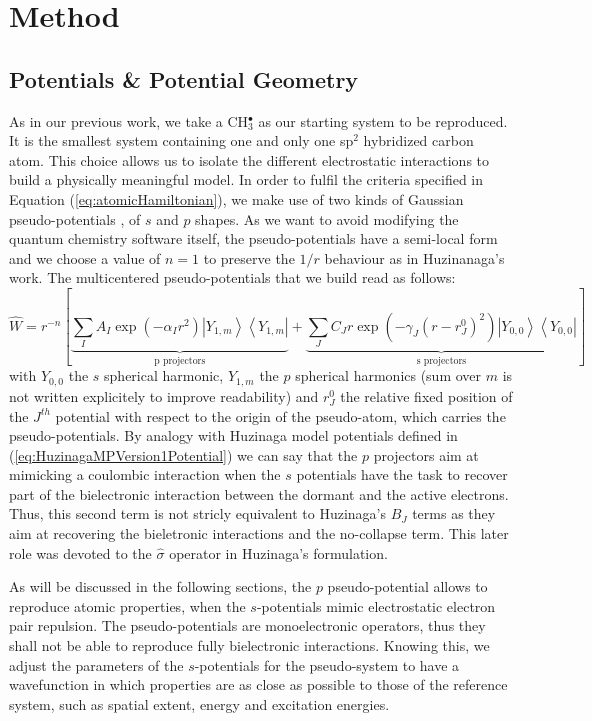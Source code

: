 \documentclass[journal=jctcce,manuscript=article]{achemso}
\begin{document}
\section{Method}

\subsection{Potentials \& Potential Geometry}

As in our previous work\cite{drujon_pseudopotentials_2013},
we take a CH\(^{\bullet}_{3}\) as our starting system to be reproduced.
It is the smallest system containing one and only one sp$^2$ hybridized carbon atom.
This choice allows us to isolate the different electrostatic interactions
to build a physically meaningful model.
In order to fulfil the criteria specified in Equation (\ref{eq:atomicHamiltonian}),
we make use of two kinds of Gaussian pseudo-potentials \cite{me_structure_theory}, of \(s\) and \(p\) shapes. As we want to avoid modifying the quantum chemistry software itself, the pseudo-potentials have a semi-local form and we choose a value of \(n = 1\) to preserve the \(1/r\) behaviour as in Huzinanaga's work.
The multicentered pseudo-potentials that we build read as follows:
\begin{equation}
\label{eq:ourPP}
\hat{W} = r^{-n}\left[%
\underbrace{\sum_IA_I\exp(-\alpha_I r^2)\left|Y_{1,m}\right>\left<Y_{1,m}\right|}_{\text{p projectors}}%
+%
\underbrace{\sum_JC_Jr\exp(-\gamma_J (r-r^0_J)^2)\left|Y_{0,0}\right>\left<Y_{0,0}\right|}_{\text{s projectors}}%
\right]
\end{equation}
with $Y_{0,0}$ the $s$ spherical harmonic, $Y_{1,m}$ the $p$ spherical harmonics (sum over $m$
is not written explicitely to improve readability) and $r^0_J$ the relative fixed position of the $J^{th}$
potential with respect to the origin of the pseudo-atom, which carries the pseudo-potentials.
By analogy with Huzinaga model potentials defined in (\ref{eq:HuzinagaMPVersion1Potential})
we can say that the $p$ projectors aim at mimicking a coulombic interaction
when the $s$ potentials have the task to recover part of the bielectronic interaction
between the dormant and the active electrons.
Thus, this second term is not stricly equivalent to Huzinaga's $B_J$ terms as they aim at recovering
the bieletronic interactions and the no-collapse term.
This later role was devoted to the $\hat{\sigma}$ operator in Huzinaga's formulation.

As will be discussed in the following sections,
the \(p\) pseudo-potential allows to reproduce atomic properties, when the
\(s\)-potentials mimic electrostatic electron pair repulsion. The pseudo-potentials are monoelectronic operators, thus they shall not be able to reproduce fully bielectronic interactions. Knowing this, we adjust the parameters of the \(s\)-potentials for the pseudo-system to have a wavefunction in which properties are as close as possible to those of the reference system, such as spatial extent, energy and excitation energies.
\end{document}

